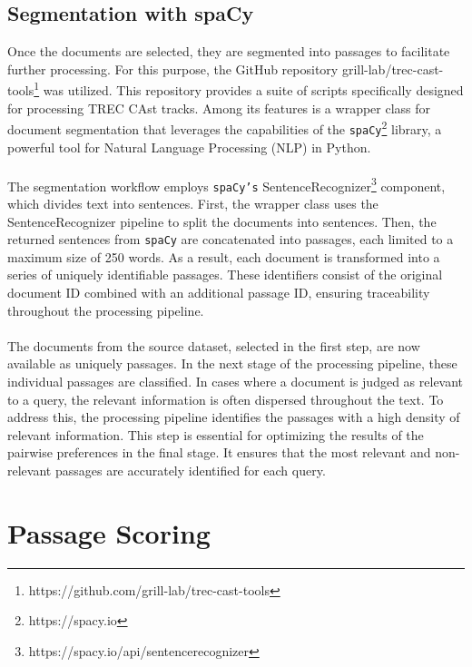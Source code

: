 \subsection{Segmentation with spaCy}\label{segmentation-with-spacy}

Once the documents are selected, they are segmented into passages to facilitate further processing. For this purpose, the GitHub repository grill-lab/trec-cast-tools\footnote{https://github.com/grill-lab/trec-cast-tools} was utilized. This repository provides a suite of scripts specifically designed for processing TREC CAst tracks. Among its features is a wrapper class for document segmentation that leverages the capabilities of the \texttt{spaCy}\footnote{https://spacy.io} library, a powerful tool for Natural Language Processing (NLP) in Python.
\\\\
The segmentation workflow employs \texttt{spaCy's} SentenceRecognizer\footnote{https://spacy.io/api/sentencerecognizer} component, which divides text into sentences. First, the wrapper class uses the SentenceRecognizer pipeline to split the documents into sentences. Then, the returned sentences from \texttt{spaCy} are concatenated into passages, each limited to a maximum size of 250 words. As a result, each document is transformed into a series of uniquely identifiable passages. These identifiers consist of the original document ID combined with an additional passage ID, ensuring traceability throughout the processing pipeline.
\\\\
The documents from the source dataset, selected in the first step, are now available as uniquely passages. In the next stage of the processing pipeline, these individual passages are classified. In cases where a document is judged as relevant to a query, the relevant information is often dispersed throughout the text. To address this, the processing pipeline identifies the passages with a high density of relevant information. This step is essential for optimizing the results of the pairwise preferences in the final stage. It ensures that the most relevant and non-relevant passages are accurately identified for each query.


\section{Passage Scoring}\label{passage-scoring}

